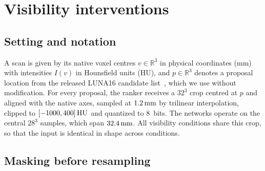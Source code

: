 \section{Visibility interventions}
\label{sec:visibility}

\subsection{Setting and notation}
\label{sec:setting}

A scan is given by its native voxel centres $v\in\mathbb{R}^3$ in physical coordinates (mm) with intensities $I(v)$ in Hounsfield units (HU), and $p\in\mathbb{R}^3$ denotes a proposal location from the released LUNA16 candidate list~\cite{setio2017luna16}, which we use without modification. For every proposal, the ranker receives a $32^3$ crop centred at $p$ and aligned with the native axes, sampled at $1.2\,\mathrm{mm}$ by trilinear interpolation, clipped to $[-1000,400]\,\mathrm{HU}$ and quantized to 8~bits. The networks operate on the central $28^3$ samples, which span $32.4\,\mathrm{mm}$. All visibility conditions share this crop, so that the input is identical in shape across conditions.

\subsection{Masking before resampling}
\label{sec:mask}

